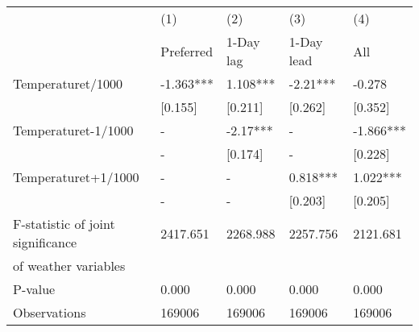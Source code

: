 \documentclass[11pt]{article}
\begin{document}
	
	\begin{center}
	 \label{tab:title} 
	\begin{tabular}{lllll}
		\toprule
		{} &        (1) &       (2) &       (3) &        (4) \\
		&  Preferred &    1-Day lag &   1-Day lead &          All \\
		\midrule
		Temperaturet/1000                 &  -1.363*** &  1.108*** &  -2.21*** &     -0.278 \\
		&    [0.155] &   [0.211] &   [0.262] &    [0.352] \\
		Temperaturet-1/1000               &          - &  -2.17*** &         - &  -1.866*** \\
		&          - &   [0.174] &         - &    [0.228] \\
		Temperaturet+1/1000               &          - &         - &  0.818*** &   1.022*** \\
		&            - &            - &      [0.203] &      [0.205] \\
		F-statistic of joint significance &   2417.651 &  2268.988 &  2257.756 &   2121.681 \\
		of weather variables              &            &           &           &            \\
		P-value                           &      0.000 &     0.000 &     0.000 &      0.000 \\
		\midrule
		Observations                      &     169006 &    169006 &    169006 &     169006 \\
		\bottomrule
	\end{tabular}
	\end{center}
	
\end{document}
